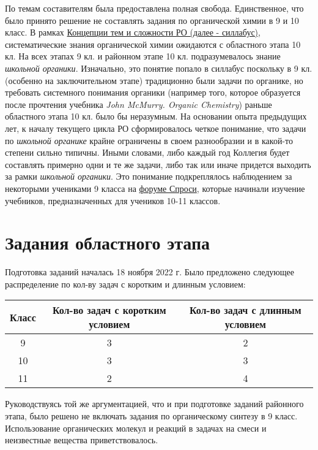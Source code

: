 По темам составителям была предоставлена полная свобода. Единственное, что было принято решение не составлять задания по органической химии в 9 и 10 класс. В рамках \href{https://qazcho.kz/docs/npa/respa-syllabus.pdf}{Концепции тем и сложности РО (далее - силлабус)}, систематические знания органической химии ожидаются с областного этапа 10 кл. На всех этапах 9 кл. и районном этапе 10 кл. подразумевалось знание \textit{школьной органики}. Изначально, это понятие попало в силлабус поскольку в 9 кл. (особенно на заключительном этапе) традиционно были задачи по органике, но требовать системного понимания органики (например того, которое образуется после прочтения учебника \textit{John McMurry. Organic Chemistry}) раньше областного этапа 10 кл. было бы неразумным. На основании опыта предыдущих лет, к началу текущего цикла РО сформировалось четкое понимание, что задачи по \textit{школьной органике} крайне ограничены в своем разнообразии и в какой-то степени сильно типичны. Иными словами, либо каждый год Коллегия будет составлять примерно одни и те же задачи, либо так или иначе придется выходить за рамки \textit{школьной органики}. Это понимание подкреплялось наблюдением за некоторыми учениками 9 класса на \href{https://ask.bc-pf.org}{форуме Спроси}, которые начинали изучение учебников, предназначенных для учеников 10-11 классов.

\section{Задания областного этапа}
Подготовка заданий началась 18 ноября 2022 г. Было предложено следующее распределение по кол-ву задач с коротким и длинным условием:

\begin{table}[h]
    \centering
    \begin{tabular}{|c|c|c|}
        \hline
        Класс & Кол-во задач с коротким условием & Кол-во задач с длинным условием \\ \hline
        9 & 3 & 2 \\ \hline
        10 & 3 & 3 \\ \hline
        11 & 2 & 4 \\ \hline
    \end{tabular}
    \label{tab:tasks11}
\end{table}

Руководствуясь той же аргументацией, что и при подготовке заданий районного этапа, было решено не включать задания по органическому синтезу в 9 класс. Использование органических молекул и реакций в задачах на смеси и неизвестные вещества приветствовалось. 

